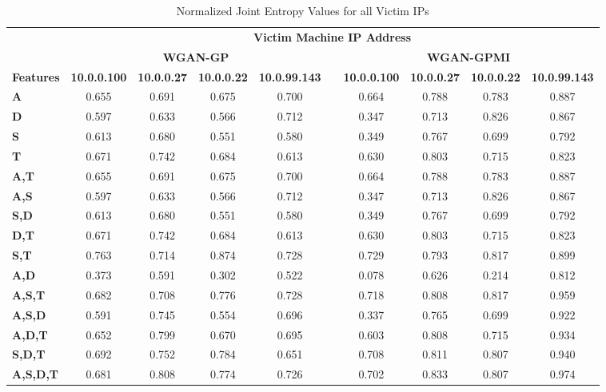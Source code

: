 \begin{table}[!htbp]
	\caption{Normalized Joint Entropy Values for all Victim IPs}
	\label{tab:inter}
	\centering
	\begin{adjustbox}{angle=90}
	\begin{tabular}{l|c|c|c|c|c|c|c|c|c|}
		\multicolumn{1}{c|}{} & \multicolumn{9}{c|}{\textbf{Victim Machine IP Address}} \\
		\multicolumn{1}{c|}{} & \multicolumn{4}{c|}{\textbf{WGAN-GP}} &  & \multicolumn{4}{c|}{\textbf{WGAN-GPMI}} \\
		\multicolumn{1}{c|}{\textbf{Features}} & \textbf{10.0.0.100} & \textbf{10.0.0.27} & \textbf{10.0.0.22} & \textbf{10.0.99.143} & \textbf{} & \textbf{10.0.0.100} & \textbf{10.0.0.27} & \textbf{10.0.0.22} & \textbf{10.0.99.143} \\ \hline
		\textbf{A} & 0.655 & 0.691 & 0.675 & 0.700 &  & 0.664 & 0.788 & 0.783 & 0.887 \\
		\textbf{D} & 0.597 & 0.633 & 0.566 & 0.712 &  & 0.347 & 0.713 & 0.826 & 0.867 \\
		\textbf{S} & 0.613 & 0.680 & 0.551 & 0.580 &  & 0.349 & 0.767 & 0.699 & 0.792 \\
		\textbf{T} & 0.671 & 0.742 & 0.684 & 0.613 &  & 0.630 & 0.803 & 0.715 & 0.823 \\ \hline
		\textbf{A,T} & 0.655 & 0.691 & 0.675 & 0.700 &  & 0.664 & 0.788 & 0.783 & 0.887 \\
		\textbf{A,S} & 0.597 & 0.633 & 0.566 & 0.712 &  & 0.347 & 0.713 & 0.826 & 0.867 \\
		\textbf{S,D} & 0.613 & 0.680 & 0.551 & 0.580 &  & 0.349 & 0.767 & 0.699 & 0.792 \\
		\textbf{D,T} & 0.671 & 0.742 & 0.684 & 0.613 &  & 0.630 & 0.803 & 0.715 & 0.823 \\
		\textbf{S,T} & 0.763 & 0.714 & 0.874 & 0.728 &  & 0.729 & 0.793 & 0.817 & 0.899 \\
		\textbf{A,D} & 0.373 & 0.591 & 0.302 & 0.522 &  & 0.078 & 0.626 & 0.214 & 0.812 \\ \hline
		\textbf{A,S,T} & 0.682 & 0.708 & 0.776 & 0.728 &  & 0.718 & 0.808 & 0.817 & 0.959 \\
		\textbf{A,S,D} & 0.591 & 0.745 & 0.554 & 0.696 &  & 0.337 & 0.765 & 0.699 & 0.922 \\
		\textbf{A,D,T} & 0.652 & 0.799 & 0.670 & 0.695 &  & 0.603 & 0.808 & 0.715 & 0.934 \\
		\textbf{S,D,T} & 0.692 & 0.752 & 0.784 & 0.651 &  & 0.708 & 0.811 & 0.807 & 0.940 \\ \hline
		\textbf{A,S,D,T} & 0.681 & 0.808 & 0.774 & 0.726 &  & 0.702 & 0.833 & 0.807 & 0.974 \\
	\end{tabular}
	\end{adjustbox}
\end{table}

